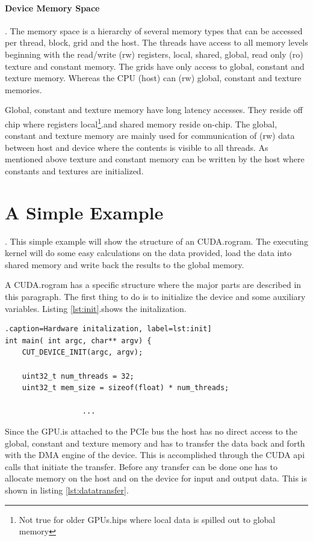 \paragraph{Device Memory Space}.%
\label{par:device_memory_space} 
The memory space is a hierarchy of several memory types that can be accessed per
thread, block, grid and the host. The threads have access to all memory levels
beginning with the read/write (rw) registers, local, shared, global, read only
(ro) texture and constant memory. The grids have only access to global, constant
and texture memory. Whereas the CPU (host) can (rw) global, constant and texture
memories.

Global, constant and texture memory have long latency accesses. They reside off
chip where registers local\footnote{Not true for older \glspl{GPU}.hips where local
data is spilled out to global memory}.and shared memory reside on-chip. The
global, constant and texture memory are mainly used for communication of (rw)
data between host and device where the contents is visible to all threads. As
mentioned above texture and constant memory can be written by the host where
constants and textures are initialized.


\section{A Simple Example}.%
\label{sub:a_simple_example} 
This simple example will show the structure of an \gls{CUDA}.rogram. The executing
kernel will do some easy calculations on the data provided, load the data into
shared memory  and write back the results to the global memory. 

A \gls{CUDA}.rogram has a specific structure where the major parts are described in
this paragraph. The first thing to do is to initialize the device and some
auxiliary variables. Listing \autoref{lst:init}.shows the initalization.

%
\begin{lstlisting}.caption=Hardware initalization, label=lst:init]
int main( int argc, char** argv) {
	CUT_DEVICE_INIT(argc, argv);

	uint32_t num_threads = 32;
	uint32_t mem_size = sizeof(float) * num_threads;
	    							
                  ...
\end{lstlisting} 
%

Since the  \gls{GPU}.is attached to the PCIe bus the host has no direct access to 
the global, constant and texture memory and has to transfer the data back
and forth with the DMA engine of the device. This is accomplished through the 
CUDA api calls that initiate the transfer. Before any transfer can be done
one has to allocate memory on the host and on the device for input and output
data. This is shown in listing \autoref{lst:datatransfer}.


